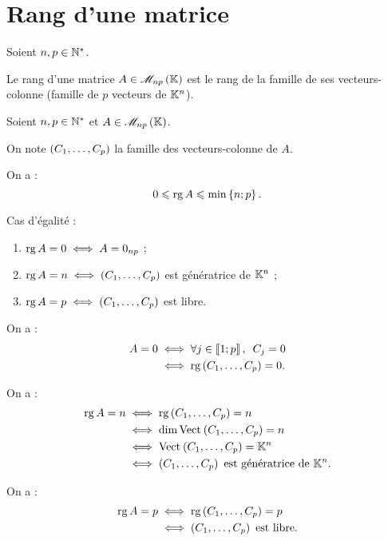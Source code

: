 \section{Rang d'une matrice}

\begin{defi}
Soient \(n,p\in\mathbb{N}^*\).

Le rang d'une matrice \(A\in\M{np}\) est le rang de la famille de ses vecteurs-colonne (famille de \(p\) vecteurs de \(\mathbb{K}^n\)).
\end{defi}

\begin{rem}
Soient \(n,p\in\mathbb{N}^*\) et \(A\in\M{np}\).

On note \(\left(C_1,\dots,C_p\right)\) la famille des vecteurs-colonne de \(A\).

On a : \[0\leqslant\operatorname{rg} A\leqslant\min\left\lbrace n;p\right\rbrace.\]

Cas d'égalité :

\begin{enumerate}
\item \(\operatorname{rg} A=0\iff A=0_{np}\) ; \\

\item \(\operatorname{rg} A=n\iff\left(C_1,\dots,C_p\right)\) est génératrice de \(\mathbb{K}^n\) ; \\

\item \(\operatorname{rg} A=p\iff\left(C_1,\dots,C_p\right)\) est libre.
\end{enumerate}
\end{rem}

\begin{dem}[1]
On a : \[\begin{aligned}
A=0&\ssi\quantifs{\forall j\in\interventierii{1}{p}}C_j=0 \\
&\ssi\rg\paren{C_1,\dots,C_p}=0.
\end{aligned}\]
\end{dem}

\begin{dem}[2]
On a : \[\begin{aligned}
\rg A=n&\ssi\rg\paren{C_1,\dots,C_p}=n \\
&\ssi\dim\Vect{C_1,\dots,C_p}=n \\
&\ssi\Vect{C_1,\dots,C_p}=\K^n \\
&\ssi\paren{C_1,\dots,C_p}\text{ est génératrice de }\K^n.
\end{aligned}\]
\end{dem}

\begin{dem}[3]
On a : \[\begin{aligned}
\operatorname{rg} A=p&\iff\operatorname{rg}\left(C_1,\dots,C_p\right)=p \\
&\iff\left(C_1,\dots,C_p\right)\text{ est libre}.
\end{aligned}\]
\end{dem}

